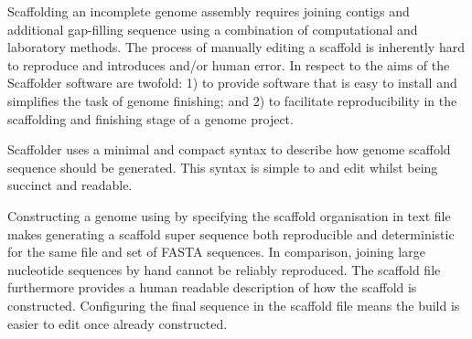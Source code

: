 \documentclass[10pt]{bmc_article}
\newenvironment{bmcformat}{\begin{raggedright}\baselineskip20pt\sloppy\setboolean{publ}{false}}{\end{raggedright}\baselineskip20pt\sloppy}
\begin{document}
\begin{bmcformat}
Scaffolding an incomplete genome assembly requires joining contigs and
additional gap-filling sequence using a combination of computational and
laboratory methods. The process of manually editing a scaffold is inherently
hard to reproduce and introduces  and/or human error. In respect to
 the aims of the Scaffolder software are
twofold: 1) to provide software that is easy to install and simplifies the
task of genome finishing; and 2) to facilitate reproducibility in the
scaffolding and finishing stage of a genome project. \pb

 Scaffolder  uses a minimal and
compact syntax to describe how  genome scaffold sequence should
be generated. This syntax is simple to  and edit
whilst being succinct and readable. 

 \pb

Constructing a genome using by specifying the scaffold organisation in text
file makes generating a scaffold super sequence both reproducible and
deterministic for the same file and set of FASTA sequences. In comparison,
joining large nucleotide sequences by hand cannot be reliably reproduced. The
scaffold file furthermore provides a human readable description of how the
scaffold is constructed. Configuring the final sequence in the scaffold file
means the build is easier to edit once already constructed. \pb


\end{bmcformat}
\end{document}
